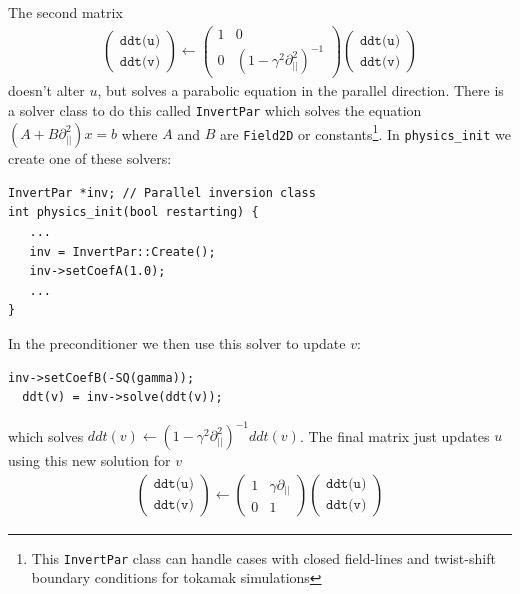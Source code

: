 \documentclass[12pt]{article}
\begin{document}
The second matrix
%
\begin{align}
\left(%
\begin{array}{c}
\texttt{ddt(u)} \\
\texttt{ddt(v)}
\end{array}
%
\right) \leftarrow \left(%
\begin{array}{cc}
1 & 0 \\
0 & \left(1 - \gamma^2\partial^2_{||}\right)^{-1}
\end{array}
%
\right)\left(%
\begin{array}{c}
\texttt{ddt(u)} \\
\texttt{ddt(v)}
\end{array}
%
\right)
\end{align}
%
doesn't alter $u$, but solves a parabolic equation in the parallel direction.
There is a solver class to do this called \texttt{InvertPar} which solves the
equation $\left(A + B\partial_{||}^2\right)x = b$ where $A$ and $B$ are
%
\lstinline!Field2D! or constants\footnote{This \texttt{InvertPar} class can
handle cases with closed field-lines and twist-shift boundary conditions for
tokamak simulations}. In \lstinline!physics_init!
%
 we create one of these solvers:
%
\begin{lstlisting}[numbers=none]
InvertPar *inv; // Parallel inversion class
int physics_init(bool restarting) {
   ...
   inv = InvertPar::Create();
   inv->setCoefA(1.0);
   ...
}
\end{lstlisting}
%
In the preconditioner we then use this solver to update $v$:
%
\begin{lstlisting}[numbers=none]
  inv->setCoefB(-SQ(gamma));
  ddt(v) = inv->solve(ddt(v));
\end{lstlisting}
%
which solves $ddt(v) \leftarrow \left(1 - \gamma^2\partial_{||}^2\right)^{-1}
ddt(v)$.  The final matrix just updates $u$ using this new solution for $v$
%
\begin{align}
\left(%
\begin{array}{c}
\texttt{ddt(u)} \\
\texttt{ddt(v)}
\end{array}
%
\right) \leftarrow \left(%
\begin{array}{cc}
1 & \gamma\partial_{||} \\
0 & 1
\end{array}
%
\right)\left(%
\begin{array}{c}
\texttt{ddt(u)} \\
\texttt{ddt(v)}
\end{array}
%
\right)
\end{align}
\end{document}
